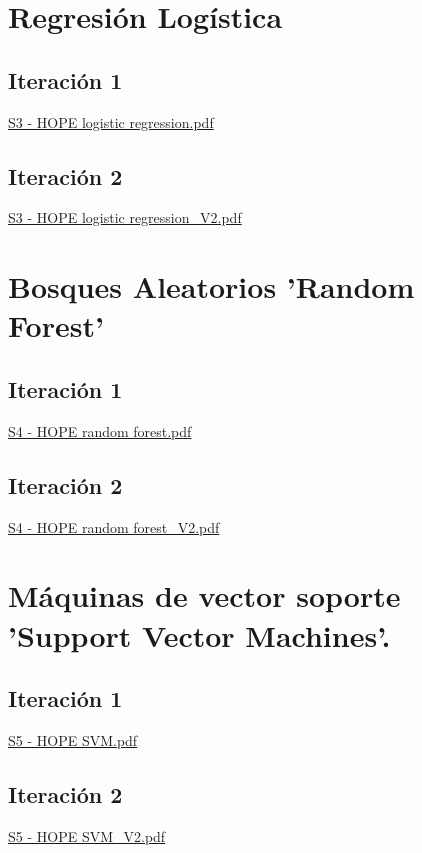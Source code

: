 \section{Regresión Logística}
\label{anx04:rl}
\subsection{Iteración 1}
\label{anx04:rl1}
\href{file://./anexos/S3 - HOPE logistic regression.pdf}{S3 - HOPE logistic regression.pdf}

\subsection{Iteración 2}
\label{anx04:rl2}
\href{file://./anexos/S3 - HOPE logistic regression_V2.pdf}{S3 - HOPE logistic regression\_V2.pdf}

\section{Bosques Aleatorios 'Random Forest'}
\label{anx05:rf}
\subsection{Iteración 1}
\label{anx05:rf1}
\href{file://./anexos/S4 - HOPE random forest.pdf}{S4 - HOPE random forest.pdf}

\subsection{Iteración 2}
\label{anx05:rf2}
\href{file://./anexos/S4 - HOPE random forest_V2.pdf}{S4 - HOPE random forest\_V2.pdf}

\section{Máquinas de vector soporte 'Support Vector Machines'.}
\label{anx06:svm}
\subsection{Iteración 1}
\label{anx06:svm1}
\href{file://./anexos/S5 - HOPE SVM.pdf}{S5 - HOPE SVM.pdf}

\subsection{Iteración 2}
\label{anx06:svm2}
\href{file://./anexos/S5 - HOPE SVM_V2.pdf}{S5 - HOPE SVM\_V2.pdf}